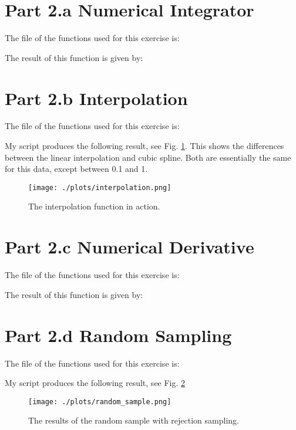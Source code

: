 \section{Part 2.a Numerical Integrator}

The file of the functions used for this exercise is:



The result of this function is given by:



\section{Part 2.b Interpolation}

The file of the functions used for this exercise is:



My script produces the following result, see Fig. \ref{fig:interp}. This shows the differences between the linear
interpolation and cubic spline. Both are essentially the same for this data, except between 0.1 and 1.

\begin{figure}[h!]
  \centering
  \texttt{[image: ./plots/interpolation.png]}
  \caption{The interpolation function in action.}
  \label{fig:interp}
\end{figure}

\section{Part 2.c Numerical Derivative}

The file of the functions used for this exercise is:



The result of this function is given by:



\section{Part 2.d Random Sampling}

The file of the functions used for this exercise is:



My script produces the following result, see Fig. \ref{fig:rand_sample}

\begin{figure}[h!]
  \centering
  \texttt{[image: ./plots/random\_sample.png]}
  \caption{The results of the random sample with rejection sampling.}
  \label{fig:rand_sample}
\end{figure}

